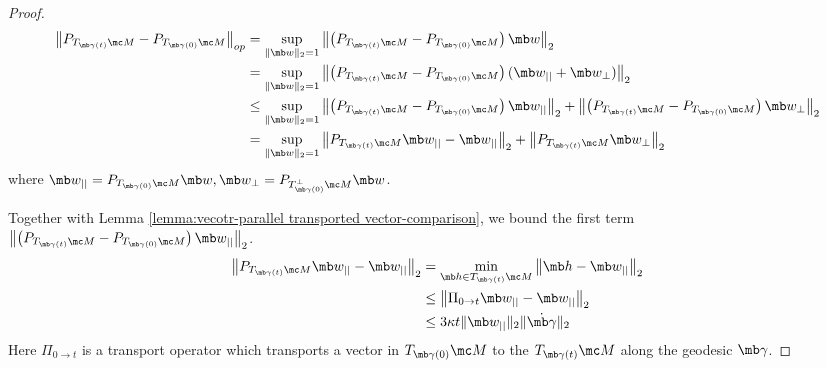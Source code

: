 \begin{proof}
\begin{equation}
    \begin{aligned}
        \left\| P_{T_{\mb\gamma(t)} \mc M} - P_{T_{\mb\gamma(0)} \mc M}\right\|_{op}
        &= \sup_{\|\mb w\|_2=1} \left\| \left( P_{T_{\mb\gamma(t)} \mc M} - P_{T_{\mb\gamma(0)} \mc M}\right) \mb w\right\|_2\\
        &= \sup_{\|\mb w\|_2=1} \left\| \left( P_{T_{\mb\gamma(t)} \mc M} - P_{T_{\mb\gamma(0)} \mc M}\right) (\mb w_{||} + \mb w_{\perp}) \right\|_2\\
        &\leq \sup_{\|\mb w\|_2=1} \left\| \left( P_{T_{\mb\gamma(t)} \mc M} - P_{T_{\mb\gamma(0)} \mc M}\right) \mb w_{||} \right\|_2 + \left\| \left( P_{T_{\mb\gamma(t)} \mc M} - P_{T_{\mb\gamma(0)} \mc M}\right) \mb w_{\perp} \right\|_2\\
        &= \sup_{\|\mb w\|_2=1} \left\| P_{T_{\mb\gamma(t)} \mc M} \mb w_{||} -  \mb w_{||} \right\|_2 
        + \left\| P_{T_{\mb\gamma(t)} \mc M} \mb w_{\perp}  \right\|_2
    \end{aligned}
\end{equation}
where $\mb w_{||} = P_{T_{\mb\gamma (0)}\mc M} \mb w, \mb w_{\perp} = P_{T_{\mb\gamma (0)}^{\perp} \mc M} \mb w$.

Together with Lemma \ref{lemma:vecotr-parallel transported vector-comparison}, we bound the first term $\left\| \left( P_{T_{\mb\gamma(t)} \mc M} - P_{T_{\mb\gamma(0)} \mc M}\right) \mb w_{||} \right\|_2$.
\begin{equation}
    \begin{aligned}
        \left\| P_{T_{\mb\gamma(t)} \mc M} \mb w_{||} -  \mb w_{||} \right\|_2
        &= \min_{\mb h \in T_{\mb\gamma(t)}\mc M} \left\| \mb h - \mb w_{||}\right\|_2\\
        &\leq \left\|  \Pi_{0\rightarrow t} \mb w_{||} - \mb w_{||}\right\|_2\\
        &\leq 3 \kappa t\|\mb w_{||}\|_2 \|\Dot{\mb\gamma}\|_2 
    \end{aligned}
\end{equation}
Here $\Pi_{0\rightarrow t}$ is a transport operator which transports a vector in $T_{\mb\gamma(0)} \mc M$ to the $T_{\mb\gamma(t)} \mc M$ along the geodesic $\mb\gamma$.


\end{proof}
